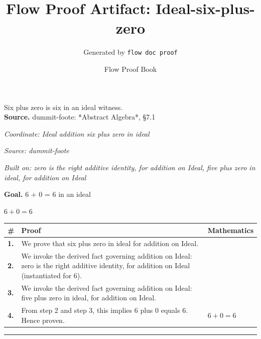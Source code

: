 \documentclass[11pt]{article}
\title{Flow Proof Artifact: Ideal-six-plus-zero}
\author{Generated by \texttt{flow doc proof}}
\date{Flow Proof Book}
\theoremstyle{definition}
\begin{document}
\maketitle
Six plus zero is six in an ideal witness.\\[0.5em]
\textbf{Source.} dummit-foote: *Abstract Algebra*, §7.1\\[0.5em]
\bigskip
{}\par
\smallskip\noindent\textit{Coordinate: Ideal \cdot addition \cdot six plus zero in ideal}\par
\smallskip\noindent\textit{Source: dummit-foote}\par
\smallskip\noindent\textit{Built on: zero is the right additive identity, for addition on Ideal, five plus zero in ideal, for addition on Ideal}\par
\medskip
\noindent\textbf{Goal.} 6 + 0 = 6 in an ideal\par
\noindent$\displaystyle 6 + 0 = 6$\par
\medskip
\noindent
\begin{tabular}{@{} >{\raggedright\arraybackslash}p{} >{\raggedright\arraybackslash}p{} >{\raggedleft\arraybackslash}p{} @{}}
\textbf{\#} & \textbf{Proof} & \textbf{Mathematics} \\
\midrule
\textbf{1.} & We prove that six plus zero in ideal for addition on Ideal. & \\[0.45em]
\textbf{2.} & We invoke the derived fact governing addition on Ideal: zero is the right additive identity, for addition on Ideal (instantiated for 6). & \\[0.45em]
\textbf{3.} & We invoke the derived fact governing addition on Ideal: five plus zero in ideal, for addition on Ideal. & \\[0.45em]
\textbf{4.} & From step 2 and step 3, this implies 6 plus 0 equals 6. Hence proven. & $\displaystyle 6 + 0 = 6$ \\[0.45em]
\bottomrule
\end{tabular}
\label{thm:Ideal-addition-six_plus_zero_in_ideal}
\par\medskip\hrule
\end{document}
